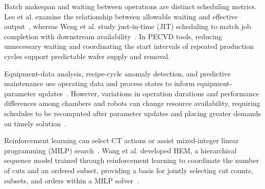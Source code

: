 \documentclass[final,5p,times,twocolumn]{elsarticle}
\begin{document}
Batch makespan and waiting between operations are distinct scheduling metrics. Lee et al. examine the relationship between allowable waiting and effective output~\citep{lee2018waiting}, whereas Weng et al. study just-in-time (JIT) scheduling to match job completion with downstream availability~\citep{weng2022jit}. In PECVD tools, reducing unnecessary waiting and coordinating the start intervals of repeated production cycles support predictable wafer supply and removal.

Equipment-data analysis, recipe-cycle anomaly detection, and predictive maintenance use operating data and process states to inform equipment-parameter updates~\citep{sun2024manufacturing,chen2020anomaly,biebl2020maintenance}. However, variations in operation durations and performance differences among chambers and robots can change resource availability, requiring schedules to be recomputed after parameter updates and placing greater demands on timely solution~\citep{rahmani2014robust}.

Reinforcement learning can select CT actions or assist mixed-integer linear programming (MILP) search~\citep{kim2025adaptivecluster,tang2020cut,huang2022cutranking,paulus2022looking}. Wang et al. developed HEM, a hierarchical sequence model trained through reinforcement learning to coordinate the number of cuts and an ordered subset, providing a basis for jointly selecting cut counts, subsets, and orders within a MILP solver~\citep{wang2023hem}.
\end{document}
